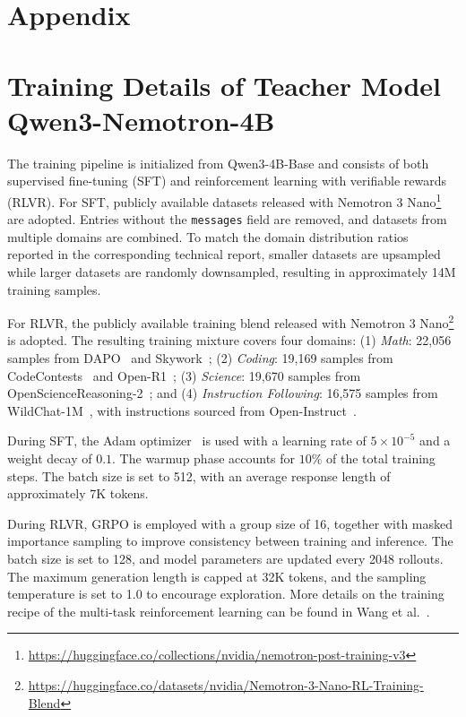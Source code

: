 \documentclass{llmxive}
\providecommand{\cite}[1]{\citep{#1}}
\begin{document}




\appendix


\section*{Appendix}
\section{Training Details of Teacher Model Qwen3-Nemotron-4B}\label{sec:appendix}

The training pipeline is initialized from Qwen3-4B-Base and consists of both supervised fine-tuning (SFT) and reinforcement learning with verifiable rewards (RLVR). For SFT, publicly available datasets released with Nemotron 3 Nano\footnote{\url{https://huggingface.co/collections/nvidia/nemotron-post-training-v3}}~\citep{blakeman2025nemotron} are adopted. Entries without the \texttt{messages} field are removed, and datasets from multiple domains are combined. To match the domain distribution ratios reported in the corresponding technical report, smaller datasets are upsampled while larger datasets are randomly downsampled, resulting in approximately 14M training samples.

For RLVR, the publicly available training blend released with Nemotron 3 Nano\footnote{\url{https://huggingface.co/datasets/nvidia/Nemotron-3-Nano-RL-Training-Blend}} is adopted. The resulting training mixture covers four domains: (1) \textit{Math}: 22,056 samples from DAPO~\citep{yu2025dapo} and Skywork~\citep{he2025skywork,skywork-or1-2025}; (2) \textit{Coding}: 19,169 samples from CodeContests~\citep{li2022competition} and Open-R1~\citep{penedo2025codeforces}; (3) \textit{Science}: 19,670 samples from OpenScienceReasoning-2~\citep{open_science_reasoning_2_2025}; and (4) \textit{Instruction Following}: 16,575 samples from WildChat-1M~\citep{zhao2024wildchat}, with instructions sourced from Open-Instruct~\citep{lambert2024tulu}.

During SFT, the Adam optimizer~\citep{kingma2014adam} is used with a learning rate of $5 \times 10^{-5}$ and a weight decay of $0.1$. The warmup phase accounts for $10\%$ of the total training steps. The batch size is set to 512, with an average response length of approximately 7K tokens.

During RLVR, GRPO is employed with a group size of 16, together with masked importance sampling to improve consistency between training and inference. The batch size is set to 128, and model parameters are updated every 2048 rollouts. The maximum generation length is capped at 32K tokens, and the sampling temperature is set to 1.0 to encourage exploration. 
More details on the training recipe of the multi-task reinforcement learning can be found in Wang et al.~\cite{wang2026mix}.
\end{document}
